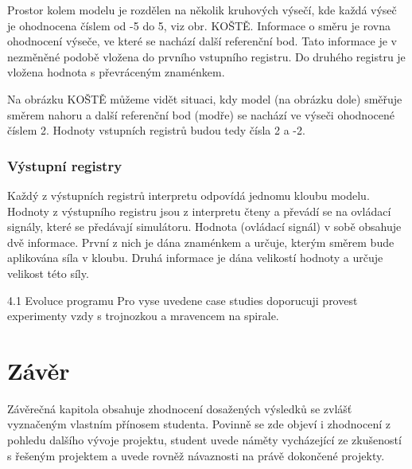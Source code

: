Prostor kolem modelu je rozdělen na několik kruhových výsečí, kde každá výseč je ohodnocena číslem od -5 do 5, viz obr. KOŠTĚ.
Informace o směru je rovna ohodnocení výseče, ve které se nachází další referenční bod.
Tato informace je v nezměněné podobě vložena do prvního vstupního registru.
Do druhého registru je vložena hodnota s převráceným znaménkem.

Na obrázku KOŠTĚ můžeme vidět situaci, kdy model (na obrázku dole) směřuje směrem nahoru a další referenční bod (modře) se nachází ve výseči ohodnocené číslem 2.
Hodnoty vstupních registrů budou tedy čísla 2 a -2.

\subsection{Výstupní registry}

Každý z výstupních registrů interpretu odpovídá jednomu kloubu modelu.
Hodnoty z výstupního registru jsou z interpretu čteny a převádí se na ovládací signály, které se předávají simulátoru.
Hodnota (ovládací signál) v sobě obsahuje dvě informace.
První z nich je dána znaménkem a určuje, kterým směrem bude aplikována síla v kloubu.
Druhá informace je dána velikostí hodnoty a určuje velikost této síly.







4.1 Evoluce programu
Pro vyse uvedene case studies doporucuji provest experimenty vzdy s
trojnozkou a mravencem na spirale.



\chapter{Závěr}
Závěrečná kapitola obsahuje zhodnocení dosažených výsledků se zvlášť vyznačeným vlastním přínosem studenta. Povinně se zde objeví i zhodnocení z pohledu dalšího vývoje projektu, student uvede náměty vycházející ze zkušeností s řešeným projektem a uvede rovněž návaznosti na právě dokončené projekty.

